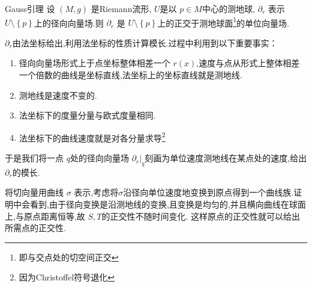 \documentclass[../../几何与拓扑.tex]{subfiles}
\begin{document}
\begin{theorem}{Gauss引理}
    设 \(  \left( M,g \right)   \) 是Riemann流形, \(  U  \)是以 \(  p \in M  \)中心的测地球, \(  \partial _{r}  \)   表示 \(  U\setminus \left\{ p \right\}  \)上的径向向量场.则 \(  \partial _{r}  \) 是 \(  U\setminus \left\{ p \right\}  \)上的正交于测地球面\footnote{即与交点处的切空间正交}的单位向量场.   
\end{theorem}

\begin{note}
     \(  \partial _{r}  \)由法坐标给出,利用法坐标的性质计算模长.过程中利用到以下重要事实：
     \begin{enumerate}
        \item 径向向量场形式上于点坐标整体相差一个 \(  r\left( x \right)   \),速度与点从形式上整体相差一个倍数的曲线是坐标直线,法坐标上的坐标直线就是测地线.   
        \item 测地线是速度不变的.
        \item 法坐标下的度量分量与欧式度量相同.
        \item 法坐标下的曲线速度就是对各分量求导\footnote{因为Christoffel符号退化}
     \end{enumerate}
      于是我们将一点 \(  q  \)处的径向向量场 \(  \partial _{r}|_{q}  \)刻画为单位速度测地线在某点处的速度,给出 \(  \partial _{r}  \)的模长.   
\end{note}

\begin{note}
    将切向量用曲线 \(   \sigma   \) 表示,考虑将\(   \sigma   \)沿径向单位速度地变换到原点得到一个曲线族.证明中会看到,由于径向变换是沿测地线的变换,且变换是均匀的,并且横向曲线在球面上,与原点距离恒等,故 \(  S,T  \)的正交性不随时间变化.  这样原点的正交性就可以给出所需点的正交性.
\end{note}
\end{document}
